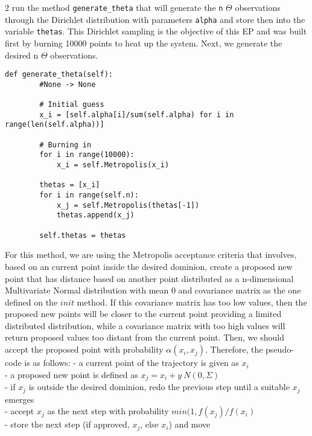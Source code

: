 \documentclass[12pt]{article}
\begin{document}
2 run the method \texttt{generate\_theta} that will generate the \texttt{n} $\Theta$ observations through the Dirichlet distribution with parameters \texttt{alpha} and store then into the variable \texttt{thetas}. This Dirichlet sampling is the objective of this EP and was built first by burning 10000 points to heat up the system. Next, we generate the desired n $\Theta$ observations.\\

\begin{lstlisting}
def generate_theta(self):
		#None -> None

		# Initial guess
		x_i = [self.alpha[i]/sum(self.alpha) for i in range(len(self.alpha))]

		# Burning in
		for i in range(10000):
			x_i = self.Metropolis(x_i)

		thetas = [x_i]
		for i in range(self.n):
			x_j = self.Metropolis(thetas[-1])
			thetas.append(x_j)

		self.thetas = thetas
\end{lstlisting}

For this method, we are using the Metropolis acceptance criteria that involves, based on an current point inside the desired dominion, create a proposed new point that has distance based on another point distributed as a n-dimensional Multivariate Normal distribution with mean 0 and covariance matrix as the one defined on the $init$ method. If this covariance matrix has too low values, then the proposed new points will be closer to the current point providing a limited distributed distribution, while a covariance matrix with too high values will return proposed values too distant from the current point. Then, we should accept the proposed point with probability $\alpha(x_i, x_j)$. Therefore, the pseudo-code is as follows:
    - a current point of the trajectory is given as $x_i$ \\
    - a proposed new point is defined as $x_j = x_i + y~N(0, \Sigma)$\\
    - if $x_j$ is outside the desired dominion, redo the previous step until a suitable $x_j$ emerges\\
    - accept $x_j$ as the next step with probability $min(1, f(x_j)/f(x_i)$\\
    - store the next step (if approved, $x_j$, else $x_i$) and move\\
\end{document}
